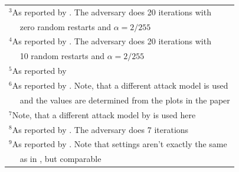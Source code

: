 \documentclass{article}
\begin{document}
\begin{table}[!htbp]
\begin{center}
{\begin{tabular}{|c|c|c|c|c|}
  \multicolumn{5}{l}{$^{\mathrm{3}}$As reported by \cite{b28}. The adversary does 20 iterations with} \\
  \multicolumn{5}{l}{$\quad$ zero random restarts and $\alpha=2/255$} \\
  \multicolumn{5}{l}{$^{\mathrm{4}}$As reported by \cite{b5}. The adversary does 20 iterations with} \\
  \multicolumn{5}{l}{$\quad$ 10 random restarts and $\alpha=2/255$} \\
  \multicolumn{5}{l}{$^{\mathrm{5}}$As reported by \cite{b1}} \\
  \multicolumn{5}{l}{$^{\mathrm{6}}$As reported by \cite{b15}. Note, that a different attack model is used} \\
  \multicolumn{5}{l}{$\quad$ and the values are determined from the plots in the paper} \\
  \multicolumn{5}{l}{$^{\mathrm{7}}$Note, that a different attack model by \cite{b10} is used here} \\
  \multicolumn{5}{l}{$^{\mathrm{8}}$As reported by \cite{b11}. The adversary does 7 iterations} \\
  \multicolumn{5}{l}{$^{\mathrm{9}}$As reported by \cite{b4}. Note that settings aren't exactly the same} \\ 
  \multicolumn{5}{l}{$\quad$ as in \cite{b11}, but comparable}
  \label{tab:modeleval}
  \end{tabular}
  }
  \label{tab1}
  \end{center}
\end{table}
\vspace*{-0.3cm}
\end{document}
